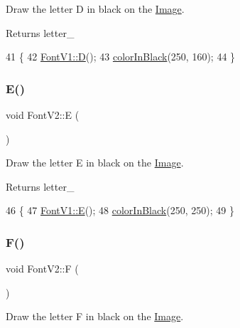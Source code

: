 Draw the letter D in black on the \mbox{\hyperlink{class_image}{Image}}. 

\begin{DoxyReturn}{Returns}
letter\+\_\+ 
\end{DoxyReturn}

\begin{DoxyCode}
41                \{
42     \mbox{\hyperlink{class_font_v1_a3f4558aabfef6e0783c2294aecf215d0}{FontV1::D}}();
43     \mbox{\hyperlink{class_font_v2_a04f2501961bc286ce70fbb6a840b0e8a}{colorInBlack}}(250, 160);
44 \}
\end{DoxyCode}
\mbox{\label{class_font_v2_a3dc7a171c913a94b688689c69abafeca}} 
\subsubsection{\texorpdfstring{E()}{E()}}
{\footnotesize\ttfamily void Font\+V2\+::E (\begin{DoxyParamCaption}{ }\end{DoxyParamCaption})}



Draw the letter E in black on the \mbox{\hyperlink{class_image}{Image}}. 

\begin{DoxyReturn}{Returns}
letter\+\_\+ 
\end{DoxyReturn}

\begin{DoxyCode}
46                \{
47     \mbox{\hyperlink{class_font_v1_ab8a34299af7a36cfd94c2691b579a0fa}{FontV1::E}}();
48     \mbox{\hyperlink{class_font_v2_a04f2501961bc286ce70fbb6a840b0e8a}{colorInBlack}}(250, 250);
49 \}
\end{DoxyCode}
\mbox{\label{class_font_v2_a061b1fab86aa9bae29fb7460a6ea6401}} 
\subsubsection{\texorpdfstring{F()}{F()}}
{\footnotesize\ttfamily void Font\+V2\+::F (\begin{DoxyParamCaption}{ }\end{DoxyParamCaption})}



Draw the letter F in black on the \mbox{\hyperlink{class_image}{Image}}. 

